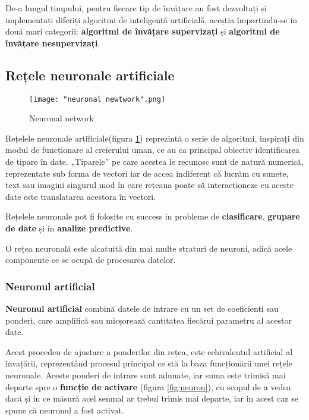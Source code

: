 \documentclass[a4paper, 12pt]{article}
\begin{document}
	De-a lungul timpului, pentru fiecare tip de învățare au fost dezvoltați și implementați diferiți algoritmi de inteligență artificială, aceștia împarțindu-se in două mari categorii: \textbf{algoritmi de învățare supervizați} și \textbf{algoritmi de învățare nesupervizați}.
	
	\bigskip
	\subsection{Rețele neuronale artificiale}
	\bigskip
	\begin{figure}[h]
		\centering
		\texttt{[image: "neuronal newtwork".png]}
		\caption{Neuronal network \textbf{\cite{zurada1992introduction}}}
		\label{fig:network}
	\end{figure}
	\quad\space Rețelele neuronale artificiale(figura \ref{fig:network}) reprezintă o serie de algoritmi, inspirați din modul de funcționare al creierului uman, ce au ca principal obiectiv identificarea de tipare în date. „Tiparele” pe care acestea le recunosc sunt de natură numerică, reprezentate sub forma de vectori iar de accea indiferent că lucrăm cu sunete, text sau imagini singurul mod în care rețeaua poate să interacționeze cu aceste date este translatarea acestora în vectori. \textbf{\cite{zurada1992introduction}}
	
	Rețelele neuronale pot fi folosite cu success in probleme de \textbf{clasificare}, \textbf{grupare de date} și in \textbf{analize predictive}.
	
	O rețea neuronală este alcatuită din mai multe straturi de neuroni, adică acele componente ce se ocupă de procesarea datelor. 
	
	\subsubsection{Neuronul artificial}
	\bigskip
	\qquad\textbf{Neuronul artificial} combină datele de intrare cu un set de coeficienti sau ponderi, care amplifică sau micșorează cantitatea fiecărui parametru al acestor date.
	
	Acest procedeu de ajustare a ponderilor din rețea, este echivalentul artificial al învațării, reprezentând procesul principal ce stă la baza funcționării unei rețele neuronale.
	Aceste ponderi de intrare sunt adunate, iar suma este trimisă mai departe spre o \textbf{funcție de activare} (figura \ref{fig:neuron}), cu scopul de a vedea dacă și in ce măsură acel semnal ar trebui trimis mai departe, iar in acest caz se spune că neuronul a fost activat.
	
\end{document}
